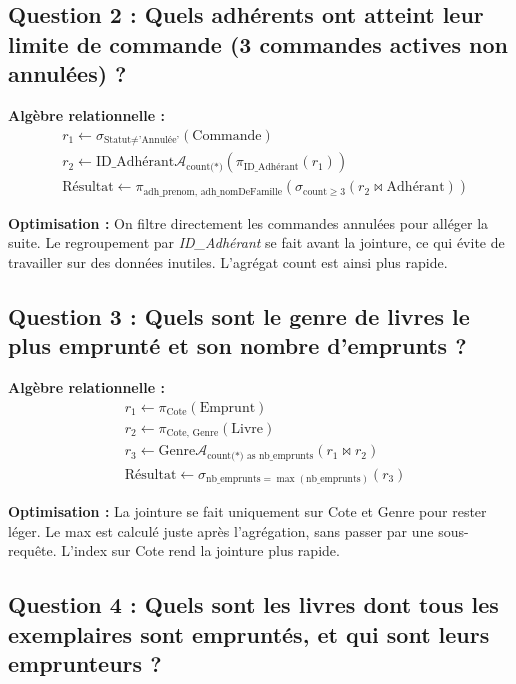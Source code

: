 \documentclass[12pt]{article}
\begin{document}
\subsection*{Question 2 : Quels adhérents ont atteint leur limite de commande (3 commandes actives non annulées) ?}

\textbf{Algèbre relationnelle :}
\[
\begin{aligned}
  &r_1 \leftarrow \sigma_{\text{Statut} \neq \text{'Annulée'}}(\text{Commande}) \\
  &r_2 \leftarrow \text{ID\_Adhérant} \mathcal{A}_{\text{count(*)}} (\pi_{\text{ID\_Adhérant}}(r_1)) \\
  &\text{Résultat} \leftarrow \pi_{\text{adh\_prenom, adh\_nomDeFamille}} (\sigma_{\text{count} \geq 3} (r_2 \bowtie \text{Adhérant}))
\end{aligned}
\]

\textbf{Optimisation :} 
On filtre directement les commandes annulées pour alléger la suite. Le regroupement par \textit{ID\_Adhérant} se fait avant la jointure, ce qui évite de travailler sur des données inutiles. L’agrégat count est ainsi plus rapide.

\subsection*{Question 3 : Quels sont le genre de livres le plus emprunté et son nombre d’emprunts ?}

\textbf{Algèbre relationnelle :}
\[
\begin{aligned}
  &r_1 \leftarrow \pi_{\text{Cote}}(\text{Emprunt}) \\
  &r_2 \leftarrow \pi_{\text{Cote, Genre}}(\text{Livre}) \\
  &r_3 \leftarrow \text{Genre} \mathcal{A}_{\text{count(*) as nb\_emprunts}} (r_1 \bowtie r_2) \\
  &\text{Résultat} \leftarrow \sigma_{\text{nb\_emprunts} = \max(\text{nb\_emprunts})} (r_3)
\end{aligned}
\]

\textbf{Optimisation :}  
La jointure se fait uniquement sur Cote et Genre pour rester léger. Le max est calculé juste après l’agrégation, sans passer par une sous-requête. L’index sur Cote rend la jointure plus rapide.


\subsection*{Question 4 : Quels sont les livres dont tous les exemplaires sont empruntés, et qui sont leurs emprunteurs ?}
\end{document}

